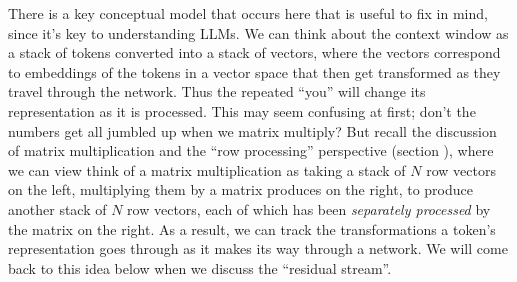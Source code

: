 There is a key conceptual model that occurs here that is useful to fix in mind, since it's key to understanding LLMs. We can think about the context window as a stack of tokens converted into a stack of vectors, where the vectors correspond to embeddings of the tokens in a vector space that then get transformed as they travel through the network. Thus the repeated ``you'' will change its representation as it is processed. This may seem confusing at first; don't the numbers get all jumbled up when we matrix multiply? But recall the discussion of matrix multiplication and the ``row processing'' perspective (section ), where we can view think of a matrix multiplication as taking a stack of $N$ row vectors on the left, multiplying them by a matrix produces on the right, to produce another stack of $N$ row vectors, each of which has been \emph{separately processed} by the matrix on the right. As a result, we can track the transformations a token's representation goes through as it makes its way through a network.  We will come back to this idea below when we discuss the ``residual stream''. 



  

